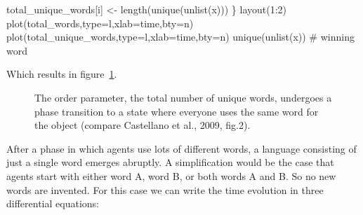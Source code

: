 \documentclass[
  a4paper,
  DIV=11,
  numbers=noendperiod,
  oneside]{scrreprt}
\newenvironment{Shaded}{}{}
\newcommand{\AttributeTok}[1]{\textcolor[rgb]{0.84,0.23,0.29}{#1}}
\newcommand{\CommentTok}[1]{\textcolor[rgb]{0.42,0.45,0.49}{#1}}
\newcommand{\DecValTok}[1]{\textcolor[rgb]{0.00,0.36,0.77}{#1}}
\newcommand{\FunctionTok}[1]{\textcolor[rgb]{0.44,0.26,0.76}{#1}}
\newcommand{\NormalTok}[1]{\textcolor[rgb]{0.14,0.16,0.18}{#1}}
\newcommand{\OtherTok}[1]{\textcolor[rgb]{0.44,0.26,0.76}{#1}}
\newcommand{\SpecialCharTok}[1]{\textcolor[rgb]{0.00,0.36,0.77}{#1}}
\newcommand{\StringTok}[1]{\textcolor[rgb]{0.01,0.18,0.38}{#1}}
\begin{document}
\begin{Shaded}
\begin{Highlighting}[]
\NormalTok{  total\_unique\_words[i] }\OtherTok{\textless{}{-}} \FunctionTok{length}\NormalTok{(}\FunctionTok{unique}\NormalTok{(}\FunctionTok{unlist}\NormalTok{(x)))}
\NormalTok{\}}
\FunctionTok{layout}\NormalTok{(}\DecValTok{1}\SpecialCharTok{:}\DecValTok{2}\NormalTok{)}
\FunctionTok{plot}\NormalTok{(total\_words,}\AttributeTok{type=}\StringTok{\textquotesingle{}l\textquotesingle{}}\NormalTok{,}\AttributeTok{xlab=}\StringTok{\textquotesingle{}time\textquotesingle{}}\NormalTok{,}\AttributeTok{bty=}\StringTok{\textquotesingle{}n\textquotesingle{}}\NormalTok{)}
\FunctionTok{plot}\NormalTok{(total\_unique\_words,}\AttributeTok{type=}\StringTok{\textquotesingle{}l\textquotesingle{}}\NormalTok{,}\AttributeTok{xlab=}\StringTok{\textquotesingle{}time\textquotesingle{}}\NormalTok{,}\AttributeTok{bty=}\StringTok{\textquotesingle{}n\textquotesingle{}}\NormalTok{)}
\FunctionTok{unique}\NormalTok{(}\FunctionTok{unlist}\NormalTok{(x)) }\CommentTok{\# winning word}
\end{Highlighting}
\end{Shaded}

Which results in figure~\ref{fig-ch7-img3-old-91}.

\begin{figure}


\caption{\label{fig-ch7-img3-old-91}The order parameter, the total
number of unique words, undergoes a phase transition to a state where
everyone uses the same word for the object (compare Castellano et al.,
2009, fig.2).}

\end{figure}%

After a phase in which agents use lots of different words, a language
consisting of just a single word emerges abruptly. A simplification
would be the case that agents start with either word A, word B, or both
words A and B. So no new words are invented. For this case we can write
the time evolution in three differential equations:
\end{document}
